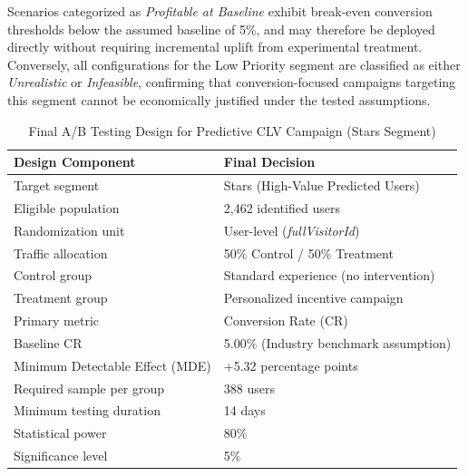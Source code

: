 \documentclass[conference]{IEEEtran}
\begin{document}
Scenarios categorized as \textit{Profitable at Baseline}
exhibit break-even conversion thresholds below the assumed
baseline of 5\%, and may therefore be deployed directly
without requiring incremental uplift from experimental
treatment. Conversely, all configurations for the Low
Priority segment are classified as either
\textit{Unrealistic} or \textit{Infeasible}, confirming
that conversion-focused campaigns targeting this segment
cannot be economically justified under the tested
assumptions.
\begin{table}[H]
\centering
\caption{Final A/B Testing Design for Predictive CLV Campaign (Stars Segment)}
\label{tab:clv_ab_final_design}

\renewcommand{\arraystretch}{1.1}
\setlength{\tabcolsep}{3pt}
\footnotesize

\begin{tabular}{|p{3.5cm}|p{3.8cm}|}
\toprule

\textbf{Design Component} & \textbf{Final Decision} \\

\midrule

Target segment & Stars (High-Value Predicted Users) \\

Eligible population & 2,462 identified users \\

Randomization unit & User-level (\textit{fullVisitorId}) \\

Traffic allocation & 50\% Control / 50\% Treatment \\

Control group & Standard experience (no intervention) \\

Treatment group & Personalized incentive campaign \\

Primary metric & Conversion Rate (CR) \\

Baseline CR & 5.00\% (Industry benchmark assumption) \\

Minimum Detectable Effect (MDE)
& +5.32 percentage points \\

Required sample per group & 388 users \\

Minimum testing duration & 14 days \\

Statistical power & 80\% \\

Significance level & 5\% \\

\bottomrule
\end{tabular}

\end{table}
\end{document}
